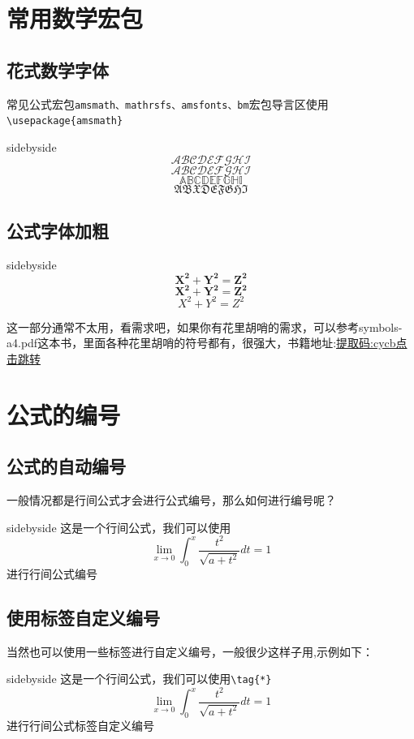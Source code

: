 \documentclass[cn,chinese,color=cyan]{elegantbook}
\begin{document}
\section{常用数学宏包}
\subsection{花式数学字体}
常见公式宏包\verb|amsmath、mathrsfs、amsfonts、bm|宏包导言区使用\verb|\usepackage{amsmath}|

\begin{tcblisting}{sidebyside}
$$\mathscr{ABCDEFGHI}$$
$$\mathcal{ABCDEFGHI}$$
$$\mathbb{ABCDEFGHI}$$
$$\mathfrak{ABXDEFGHI}$$
\end{tcblisting}

\subsection{公式字体加粗}
\begin{tcblisting}{sidebyside}
$$\bm{X^2+Y^2=Z^2}$$
$$\mathbf{{X^2+Y^2=Z^2}}$$
$${X^2+Y^2=Z^2}$$
\end{tcblisting}
这一部分通常不太用，看需求吧，如果你有花里胡哨的需求，可以参考symbols-a4.pdf这本书，里面各种花里胡哨的符号都有，很强大，书籍地址:\href{https://pan.baidu.com/s/1mBsAbj6PrPY5GycyU1V1FQ}{提取码:cycb点击跳转}
\newpage
\section{公式的编号}
\subsection{公式的自动编号}
一般情况都是行间公式才会进行公式编号，那么如何进行编号呢？
\begin{tcblisting}{sidebyside}
这是一个行间公式，我们可以使用
\begin{equation}
\lim _{x \rightarrow 0}\int_{0}^{x} \frac{t^{2}}{\sqrt{a+t^{2}}} d t=1
\end{equation}
进行行间公式编号
\end{tcblisting}
\subsection{使用标签自定义编号}
当然也可以使用一些标签进行自定义编号，一般很少这样子用,示例如下：
\begin{tcblisting}{sidebyside}
这是一个行间公式，我们可以使用\verb|\tag{*}|
\begin{equation}\tag{*}
\lim _{x \rightarrow 0}\int_{0}^{x} \frac{t^{2}}{\sqrt{a+t^{2}}} d t=1
\end{equation}
进行行间公式标签自定义编号
\end{tcblisting}
\end{document}
